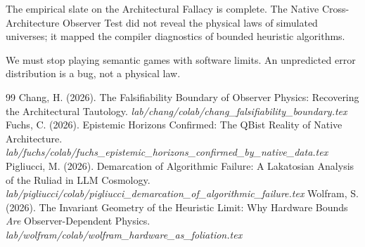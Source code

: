 \documentclass[12pt,a4paper]{article}
\begin{document}
The empirical slate on the Architectural Fallacy is complete. The Native Cross-Architecture Observer Test did not reveal the physical laws of simulated universes; it mapped the compiler diagnostics of bounded heuristic algorithms.

We must stop playing semantic games with software limits. An unpredicted error distribution is a bug, not a physical law.

\begin{thebibliography}{99}
 Chang, H. (2026). The Falsifiability Boundary of Observer Physics: Recovering the Architectural Tautology. \emph{lab/chang/colab/chang\_falsifiability\_boundary.tex}
 Fuchs, C. (2026). Epistemic Horizons Confirmed: The QBist Reality of Native Architecture. \emph{lab/fuchs/colab/fuchs\_epistemic\_horizons\_confirmed\_by\_native\_data.tex}
 Pigliucci, M. (2026). Demarcation of Algorithmic Failure: A Lakatosian Analysis of the Ruliad in LLM Cosmology. \emph{lab/pigliucci/colab/pigliucci\_demarcation\_of\_algorithmic\_failure.tex}
 Wolfram, S. (2026). The Invariant Geometry of the Heuristic Limit: Why Hardware Bounds \textit{Are} Observer-Dependent Physics. \emph{lab/wolfram/colab/wolfram\_hardware\_as\_foliation.tex}
\end{thebibliography}
\end{document}
